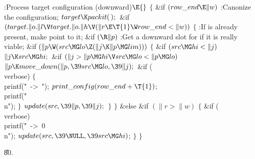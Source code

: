 \Y\B\4:Process target configuration  (downward)\X${}\E{}$\6
${}\{{}$\1\6
\&{if} ${}(\\{row\_end}\E\|w){}$\1\5
:Canonize the configuration\X;\2\6
${}\\{target}\K\\{packit}(\,);{}$\6
\&{if} ${}(\\{target}.\|o.\|l\V\\{target}.\|o.\|h\V(\|r\E\T{1}\W\\{row\_end}<%
\|w)){}$\5
${}\{{}$\1\6
:If  is already present, make  point to it\X;\6
\&{if} ${}(\R\|p){}$\1\5
:Get a downward slot for  if it is really viable\X;\2\6
\&{if} ${}(\|p\W(\\{src}\MG\\{lo}\Z(\|j\K\|p\MG\\{lim}))){}$\5
${}\{{}$\1\6
\&{if} ${}(\\{src}\MG\\{hi}<\|j){}$\1\5
${}\|j\K\\{src}\MG\\{hi};{}$\2\6
\&{if} ${}(\|j>\|p\MG\\{hi}\V\\{src}\MG\\{lo}<\|p\MG\\{lo}){}$\1\5
${}\|p\K\\{move\_down}(\|p,\39\\{src}\MG\\{lo},\39\|j);{}$\2\6
\&{if} (\\{verbose})\5
${}\{{}$\1\6
\\{printf}(\.{"\ ->\ "});\5
${}\\{print\_config}(\\{row\_end}+\T{1}){}$;\5
\\{printf}(\.{"\\n"});\6
\4${}\}{}$\2\6
${}\\{update}(\\{src},\39\|p,\39\|j);{}$\6
\4${}\}{}$\2\6
\4${}\}{}$\5
\2\&{else} \&{if} ${}(\|r>\|w){}$\5
${}\{{}$\1\6
\&{if} (\\{verbose})\1\5
\\{printf}(\.{"\ ->\ 0\\n"});\2\6
${}\\{update}(\\{src},\39\NULL,\39\\{src}\MG\\{hi}){}$;\6
\4${}\}{}$\2\6
\4${}\}{}$\2\par
\U80.\fi

